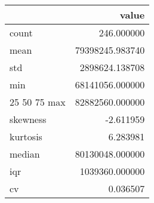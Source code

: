 \begin{tabular}{lr}
\toprule
 & value \\
\midrule
count & 246.000000 \\
mean & 79398245.983740 \\
std & 2898624.138708 \\
min & 68141056.000000 \\
25%
50%
75%
max & 82882560.000000 \\
skewness & -2.611959 \\
kurtosis & 6.283981 \\
median & 80130048.000000 \\
iqr & 1039360.000000 \\
cv & 0.036507 \\
\bottomrule
\end{tabular}
